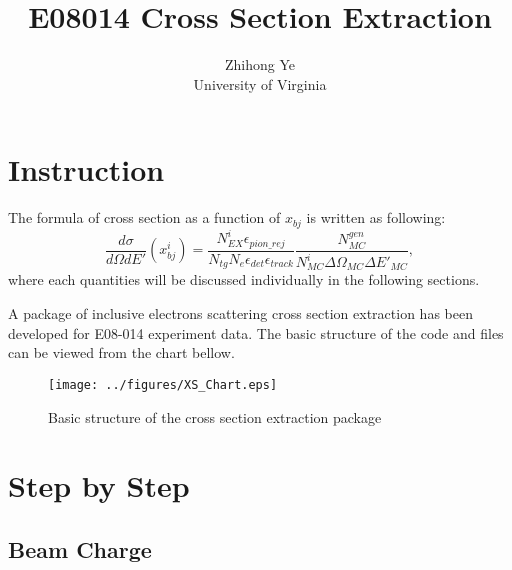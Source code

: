 \documentclass[a4paper,18.pt]{article}
\title{E08014 Cross Section Extraction}
\author{Zhihong Ye\\ University of Virginia}
\begin{document}
\maketitle

\section{Instruction}

The formula of cross section as a function of $x_{bj}$ is written as following:
\begin{equation}
 \frac{d\sigma}{d\Omega dE'}(x_{bj}^{i}) = \frac{N_{EX}^{i} \epsilon_{pion\_rej}}{N_{tg} N_{e} \epsilon_{det} \epsilon_{track}} \frac{N_{MC}^{gen}}{N_{MC}^{i} \Delta\Omega_{MC} \Delta E'_{MC}},
\label{xs_eq}
\end{equation}
where each quantities will be discussed individually in the following sections.

A package of inclusive electrons scattering cross section extraction has been developed for E08-014 experiment data. The basic structure of the code and files can be viewed from the chart bellow.

\begin{figure}[h!]
 \centerline{\texttt{[image: ../figures/XS\_Chart.eps]}}
 \caption[Basic structure of XS package]{Basic structure of the cross section extraction package}
 \label{xs_chart}
\end{figure}

\section{Step by Step}

\subsection{Beam Charge}
\end{document}
